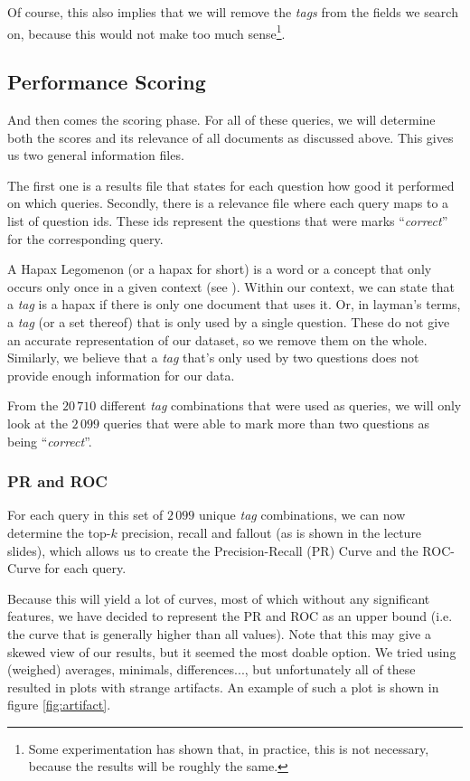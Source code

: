 \documentclass[11pt]{article}
\begin{document}
Of course, this also implies that we will remove the \textit{tags} from the fields we search on, because this would not make too much sense\footnote{Some experimentation has shown that, in practice, this is not necessary, because the results will be roughly the same.}.

\subsection{Performance Scoring}
And then comes the scoring phase. For all of these queries, we will determine both the scores and its relevance of all documents as discussed above. This gives us two general information files.

The first one is a results file that states for each question how good it performed on which queries. Secondly, there is a relevance file where each query maps to a list of question ids. These ids represent the questions that were marks ``\textit{correct}'' for the corresponding query.

A \textsf{Hapax Legomenon} (or a \textsf{hapax} for short) is a word or a concept that only occurs only once in a given context (see \cite{hapax}). Within our context, we can state that a \textit{tag} is a \textsf{hapax} if there is only one document that uses it. Or, in layman's terms, a \textit{tag} (or a set thereof) that is only used by a single question. These do not give an accurate representation of our dataset, so we remove them on the whole. Similarly, we believe that a \textit{tag} that's only used by two questions does not provide enough information for our data.

From the $20\,710$ different \textit{tag} combinations that were used as queries, we will only look at the $2\,099$ queries that were able to mark more than two questions as being ``\textit{correct}''.

\subsubsection{PR and ROC}
For each query in this set of $2\,099$ unique \textit{tag} combinations, we can now determine the top-$k$ precision, recall and fallout (as is shown in the lecture slides), which allows us to create the Precision-Recall (PR) Curve and the ROC-Curve for each query.

Because this will yield a lot of curves, most of which without any significant features, we have decided to represent the PR and ROC as an upper bound (i.e. the curve that is generally higher than all values). Note that this may give a skewed view of our results, but it seemed the most doable option. We tried using (weighed) averages, minimals, differences..., but unfortunately all of these resulted in plots with strange artifacts. An example of such a plot is shown in figure \ref{fig:artifact}.
\end{document}

